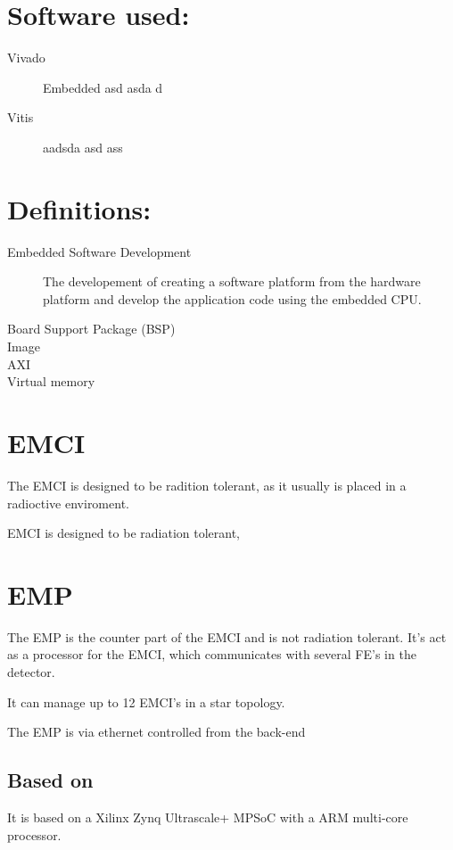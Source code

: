 \section*{Software used:}
\begin{description}
    \item[Vivado] Embedded asd asda d
    \item[Vitis] aadsda asd ass
\end{description}

\section{Definitions:}

\begin{description}
    \item[Embedded Software Development] The developement of creating a software platform from the hardware platform and develop the application code using the embedded CPU.
    \item[Board Support Package (BSP)] 
    \item[Image]

    \item[AXI]
    \item[Virtual memory]
    \item[]
    
\end{description}

\section{EMCI}

The EMCI is designed to be radition tolerant, as it usually is placed in a radioctive enviroment. 

EMCI is designed to be radiation tolerant, 

\section{EMP}

The EMP is the counter part of the EMCI and is not radiation tolerant. It's act as a processor for the EMCI, which communicates with several FE's in the detector.


It can manage up to 12 EMCI's in a star topology. 

The EMP is via ethernet controlled from the back-end 

\subsection{Based on}
It is based on a Xilinx Zynq Ultrascale+ MPSoC with a ARM multi-core processor. 

